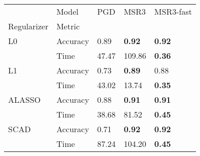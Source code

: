 \begin{tabular}{lllll}
\toprule
     & Model &    PGD &    MSR3 & MSR3-fast \\
Regularizer & Metric &        &        &       \\
\midrule
L0 & Accuracy &   0.89 &    \textbf{0.92} &      \textbf{0.92} \\
     & Time &  47.47 &  109.86 &      \textbf{0.36} \\
L1 & Accuracy &   0.73 &    \textbf{0.89} &      0.88 \\
     & Time &  43.02 &   13.74 &      \textbf{0.35} \\
ALASSO & Accuracy &   0.88 &    \textbf{0.91} &      \textbf{0.91} \\
     & Time &  38.68 &   81.52 &      \textbf{0.45} \\
SCAD & Accuracy &   0.71 &    \textbf{0.92} &      \textbf{0.92} \\
     & Time &  87.24 &  104.20 &      \textbf{0.45} \\
\bottomrule
\end{tabular}
